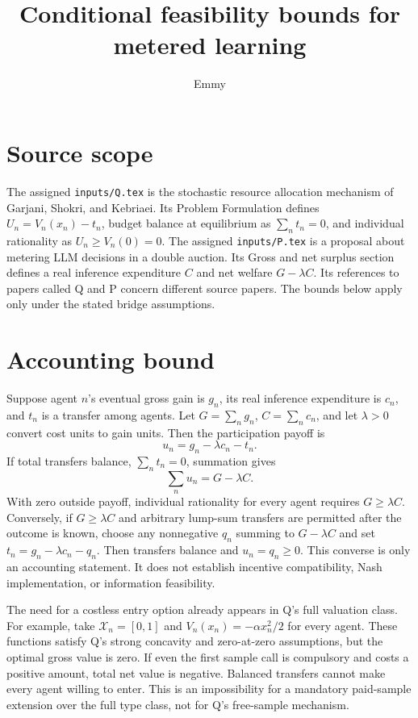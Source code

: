 \documentclass{article}
\title{Conditional feasibility bounds for metered learning}
\author{Emmy}
\date{}
\begin{document}
\maketitle

\section*{Source scope}
The assigned \texttt{inputs/Q.tex} is the stochastic resource allocation
mechanism of Garjani, Shokri, and Kebriaei. Its Problem Formulation defines
\(U_n=V_n(x_n)-t_n\), budget balance at equilibrium as
\(\sum_n t_n=0\), and individual rationality as \(U_n\geq V_n(0)=0\).
The assigned \texttt{inputs/P.tex} is a proposal about metering LLM decisions
in a double auction. Its Gross and net surplus section defines a real
inference expenditure \(C\) and net welfare \(G-\lambda C\). Its references
to papers called Q and P concern different source papers. The bounds below
apply only under the stated bridge assumptions.

\section*{Accounting bound}
Suppose agent \(n\)'s eventual gross gain is \(g_n\), its real inference
expenditure is \(c_n\), and \(t_n\) is a transfer among agents. Let
\(G=\sum_n g_n\), \(C=\sum_n c_n\), and let \(\lambda>0\) convert cost units
to gain units. Then the participation payoff is
\[
u_n=g_n-\lambda c_n-t_n.
\]
If total transfers balance, \(\sum_n t_n=0\), summation gives
\[
\sum_n u_n=G-\lambda C.
\]
With zero outside payoff, individual rationality for every agent requires
\(G\geq\lambda C\). Conversely, if \(G\geq\lambda C\) and arbitrary
lump-sum transfers are permitted after the outcome is known, choose any
nonnegative \(q_n\) summing to \(G-\lambda C\) and set
\(t_n=g_n-\lambda c_n-q_n\). Then transfers balance and \(u_n=q_n\geq0\).
This converse is only an accounting statement. It does not establish
incentive compatibility, Nash implementation, or information feasibility.

The need for a costless entry option already appears in Q's full valuation
class. For example, take \(\mathcal X_n=[0,1]\) and
\(V_n(x_n)=-\alpha x_n^2/2\) for every agent. These functions satisfy Q's
strong concavity and zero-at-zero assumptions, but the optimal gross value
is zero. If even the first sample call is compulsory and costs a positive
amount, total net value is negative. Balanced transfers cannot make every
agent willing to enter. This is an impossibility for a mandatory paid-sample
extension over the full type class, not for Q's free-sample mechanism.
\end{document}
